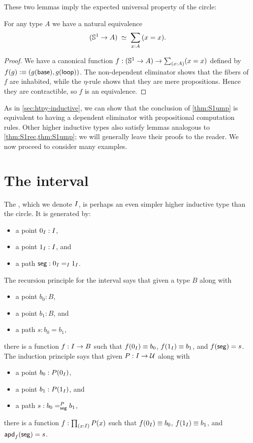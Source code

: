 These two lemmas imply the expected universal property of the circle:

\begin{lem}\label{thm:S1ump}
  For any type $A$ we have a natural equivalence
  \[ (\Sn^1 \to A) \;\simeq\;
  \sm{x:A} (x=x).
  \]
\end{lem}
\begin{proof}
  We have a canonical function $f:(\Sn^1 \to A) \to \sm{x:A} (x=x)$ defined by $f(g) \defeq (g(\base),\ap g \lloop)$.
  The non-dependent eliminator shows that the fibers of $f$ are inhabited, while the $\eta$-rule shows that they are mere propositions.
  Hence they are contractible, so $f$ is an equivalence.
\end{proof}

As in \autoref{sec:htpy-inductive}, we can show that the conclusion of \autoref{thm:S1ump} is equivalent to having a dependent eliminator with propositional computation rules.
Other higher inductive types also satisfy lemmas analogous to \autoref{thm:S1rec,thm:S1ump}; we will generally leave their proofs to the reader.
We now proceed to consider many examples.


\section{The interval}
\label{sec:interval}

The , which we denote $\interval$, is perhaps an even simpler higher inductive type than the circle.
It is generated by:
\begin{itemize}
\item a point $\izero:\interval$,
\item a point $\ione:\interval$, and
\item a path $\seg : \id[\interval]\izero\ione$.
\end{itemize}
The recursion principle for the interval says that given a type $B$ along with
\begin{itemize}
\item a point $b_0:B$,
\item a point $b_1:B$, and
\item a path $s:b_0=b_1$,
\end{itemize}
there is a function $f:\interval\to B$ such that $f(\izero)\jdeq b_0$, $f(\ione)\jdeq b_1$, and $\ap f \seg = s$.
The induction principle says that given $P:\interval\to\type$ along with
\begin{itemize}
\item a point $b_0:P(\izero)$,
\item a point $b_1:P(\ione)$, and
\item a path $s:\dpath{P}{\seg}{b_0}{b_1}$,
\end{itemize}
there is a function $f:\prd{x:\interval} P(x)$ such that $f(\izero)\jdeq b_0$, $f(\ione)\jdeq b_1$, and $\apd f \seg = s$.

